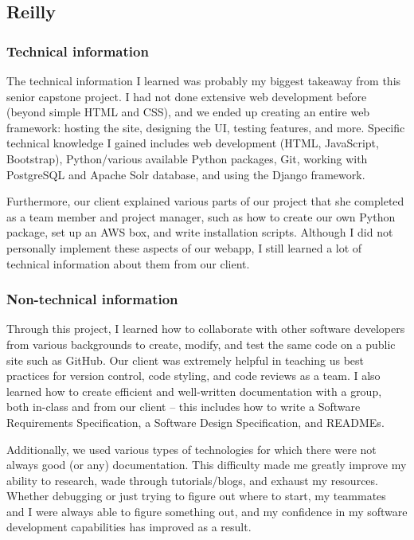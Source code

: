 \documentclass[onecolumn, draftclsnofoot,10pt, compsoc]{IEEEtran}
\begin{document}
\begin{flushleft}
\subsection{Reilly}
\subsubsection{Technical information}
The technical information I learned was probably my biggest takeaway from this senior capstone project. I had not done extensive web development before (beyond simple HTML and CSS), and we ended up creating an entire web framework: hosting the site, designing the UI, testing features, and more. Specific technical knowledge I gained includes web development (HTML, JavaScript, Bootstrap), Python/various available Python packages, Git, working with PostgreSQL  and Apache Solr database, and using the Django framework.
 
Furthermore, our client explained various parts of our project that she completed as a team member and project manager, such as how to create our own Python package, set up an AWS box, and write installation scripts. Although I did not personally implement these aspects of our webapp, I still learned a lot of technical information about them from our client.
 
\subsubsection{Non-technical information}
Through this project, I learned how to collaborate with other software developers from various backgrounds to create, modify, and test the same code on a public site such as GitHub. Our client was extremely helpful in teaching us best practices for version control, code styling, and code reviews as a team. I also learned how to create efficient and well-written documentation with a group, both in-class and from our client – this includes how to write a Software Requirements Specification, a Software Design Specification, and READMEs.
 
Additionally, we used various types of technologies for which there were not always good (or any) documentation. This difficulty made me greatly improve my ability to research, wade through tutorials/blogs, and exhaust my resources. Whether debugging or just trying to figure out where to start, my teammates and I were always able to figure something out, and my confidence in my software development capabilities has improved as a result.
 

\end{flushleft}
\end{document}
